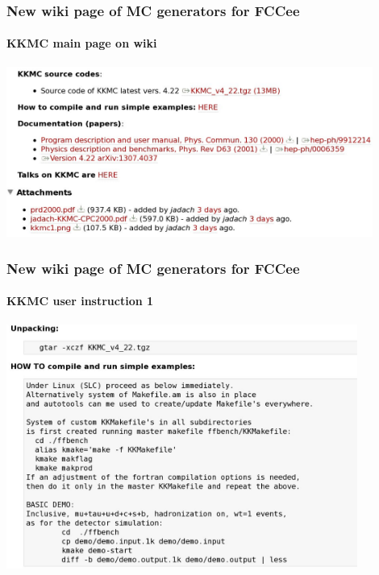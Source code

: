 \documentclass{beamer}
\begin{document}
\begin{frame}[fragile]
\frametitle{\bf New wiki page of MC generators for FCCee}
\framesubtitle{\bf KKMC main page on wiki}

\includegraphics[width=120mm]{./wiki1k.jpg}

\end{frame}



\begin{frame}[fragile]
\frametitle{\bf New wiki page of MC generators for FCCee}
\framesubtitle{\bf KKMC user instruction 1}

\vspace{-3mm}
\includegraphics[width=115mm]{./wiki2k.jpg}

\end{frame}
\end{document}
